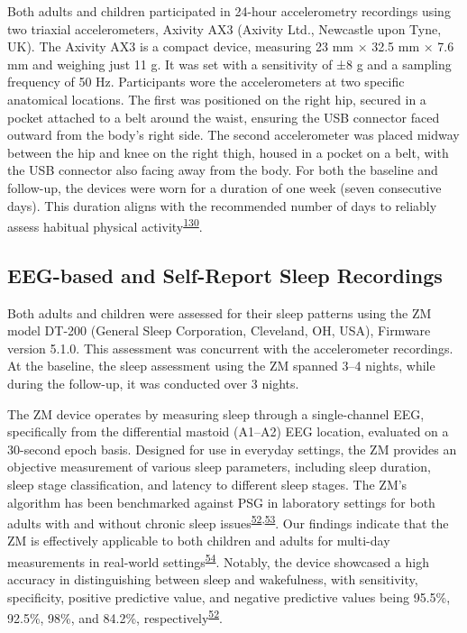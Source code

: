 \documentclass[
  10pt,
]{scrbook}
\begin{document}
Both adults and children participated in 24-hour accelerometry
recordings using two triaxial accelerometers, Axivity AX3 (Axivity Ltd.,
Newcastle upon Tyne, UK). The Axivity AX3 is a compact device, measuring
23 mm × 32.5 mm × 7.6 mm and weighing just 11 g. It was set with a
sensitivity of ±8 g and a sampling frequency of 50 Hz. Participants wore
the accelerometers at two specific anatomical locations. The first was
positioned on the right hip, secured in a pocket attached to a belt
around the waist, ensuring the USB connector faced outward from the
body's right side. The second accelerometer was placed midway between
the hip and knee on the right thigh, housed in a pocket on a belt, with
the USB connector also facing away from the body. For both the baseline
and follow-up, the devices were worn for a duration of one week (seven
consecutive days). This duration aligns with the recommended number of
days to reliably assess habitual physical
activity\textsuperscript{\protect\hyperlink{ref-jaeschke_variability_2018}{130}}.

\hypertarget{eeg-based-and-self-report-sleep-recordings}{%
\subsection{EEG-based and Self-Report Sleep
Recordings}\label{eeg-based-and-self-report-sleep-recordings}}

Both adults and children were assessed for their sleep patterns using
the ZM model DT-200 (General Sleep Corporation, Cleveland, OH, USA),
Firmware version 5.1.0. This assessment was concurrent with the
accelerometer recordings. At the baseline, the sleep assessment using
the ZM spanned 3--4 nights, while during the follow-up, it was conducted
over 3 nights.

The ZM device operates by measuring sleep through a single-channel EEG,
specifically from the differential mastoid (A1--A2) EEG location,
evaluated on a 30-second epoch basis. Designed for use in everyday
settings, the ZM provides an objective measurement of various sleep
parameters, including sleep duration, sleep stage classification, and
latency to different sleep stages. The ZM's algorithm has been
benchmarked against PSG in laboratory settings for both adults with and
without chronic sleep
issues\textsuperscript{\protect\hyperlink{ref-kaplan_performance_2014}{52},\protect\hyperlink{ref-wang_evaluation_2015}{53}}.
Our findings indicate that the ZM is effectively applicable to both
children and adults for multi-day measurements in real-world
settings\textsuperscript{\protect\hyperlink{ref-pedersen_self-administered_2021}{54}}.
Notably, the device showcased a high accuracy in distinguishing between
sleep and wakefulness, with sensitivity, specificity, positive
predictive value, and negative predictive values being 95.5\%, 92.5\%,
98\%, and 84.2\%,
respectively\textsuperscript{\protect\hyperlink{ref-kaplan_performance_2014}{52}}.
\end{document}
